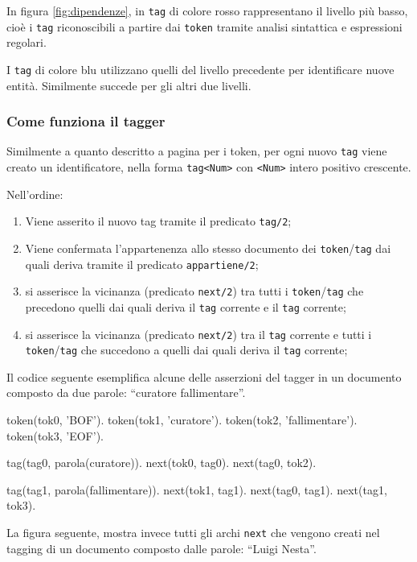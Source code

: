 In figura \ref{fig:dipendenze}, in \verb|tag| di colore rosso rappresentano il livello più basso, cioè i \verb|tag| riconoscibili a partire dai \verb|token| tramite analisi sintattica e espressioni regolari.

I \verb|tag| di colore blu utilizzano quelli del livello precedente per identificare nuove entità. Similmente succede per gli altri due livelli.

\subsubsection{Come funziona il tagger}

Similmente a quanto descritto a pagina \pageref{sec:creazionetoken} per i token, per ogni nuovo \verb|tag| viene creato un identificatore, nella forma \verb:tag<Num>: con \verb+<Num>+ intero positivo crescente.

Nell'ordine:
\begin{enumerate}
\item Viene asserito il nuovo tag tramite il predicato \verb|tag/2|;
\item Viene confermata l'appartenenza allo stesso documento dei \verb|token|/\verb|tag| dai quali deriva tramite il predicato \verb|appartiene/2|;
\item si asserisce la vicinanza (predicato \verb|next/2|) tra tutti i \verb|token|/\verb|tag| che precedono quelli dai quali deriva il \verb|tag| corrente e il \verb|tag| corrente;
\item si asserisce la vicinanza (predicato \verb|next/2|) tra il \verb|tag| corrente e tutti i \verb|token|/\verb|tag| che succedono a quelli dai quali deriva il \verb|tag| corrente;
\end{enumerate} 

Il codice seguente esemplifica alcune delle asserzioni del tagger in un documento composto da due parole: ``curatore fallimentare''.

\begin{prologcode}
token(tok0, 'BOF').
token(tok1, 'curatore').
token(tok2, 'fallimentare').
token(tok3, 'EOF').

tag(tag0, parola(curatore)).
next(tok0, tag0).
next(tag0, tok2).

tag(tag1, parola(fallimentare)).
next(tok1, tag1).
next(tag0, tag1).
next(tag1, tok3).
\end{prologcode}
\clearpage
La figura seguente, mostra invece tutti gli archi \verb|next| che vengono creati nel tagging di un documento composto dalle parole: ``Luigi Nesta''.

